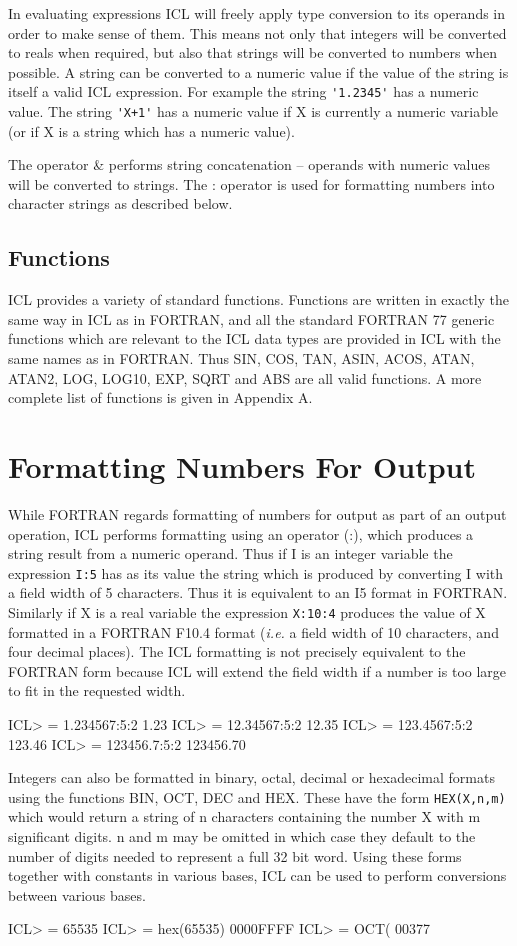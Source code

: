 \documentclass[twoside,11pt,nolof,chapters]{starlink}
\begin{document}
In evaluating expressions ICL will freely apply type conversion to its
operands in order to make sense of them. This means not only that integers
will be converted to reals when required, but also that strings will be
converted to numbers when possible. A string can be converted to a numeric value
if the value of the string is itself a valid ICL expression. For example the
string \verb+'1.2345'+ has a numeric value. The string \verb-'X+1'- has a numeric
value if X is currently a numeric variable (or if X is a string which has
a numeric value).

The operator \& performs string concatenation -- operands with numeric values
will be converted to strings. The : operator is used for
formatting numbers into character strings as described below.
\subsection{Functions}
ICL provides a variety of standard functions. Functions are written in
exactly the same way in ICL as in FORTRAN, and all the standard FORTRAN
77 generic functions which are relevant to the ICL data types are
provided in ICL with the
 same names as in FORTRAN. Thus SIN, COS, TAN,
ASIN, ACOS, ATAN, ATAN2, LOG, LOG10, EXP, SQRT and ABS are all valid
functions. A more complete list of functions is given in Appendix A.
\section{Formatting Numbers For Output}
While FORTRAN regards formatting of numbers for output as part of an
output operation, ICL performs formatting using an operator (:), which
produces a string result from a numeric operand. Thus if I is an integer
variable the expression \verb+I:5+ has as its value the string which is
produced by converting I with a field width of 5 characters. Thus it
is equivalent to an I5 format in FORTRAN. Similarly if X is a real
variable the expression \verb+X:10:4+ produces the value of X formatted
in a FORTRAN F10.4 format (\emph{i.e.} a field width of 10 characters, and
four decimal places). The ICL formatting is not precisely equivalent
to the FORTRAN form because ICL will extend the field width if a number
is too large to fit in the requested width.
\begin{terminalv}
    ICL> = 1.234567:5:2
     1.23
    ICL> = 12.34567:5:2
    12.35
    ICL> = 123.4567:5:2
    123.46
    ICL> = 123456.7:5:2
    123456.70
\end{terminalv}
Integers can also be formatted in binary, octal, decimal or hexadecimal formats
using the functions BIN, OCT, DEC and HEX. These have the form
\verb+HEX(X,n,m)+ which would return a string of n characters containing
the number X with m significant digits. n and m may be omitted in which case
they default to the number of digits needed to represent a full 32 bit word.
Using these forms together with constants in various bases, ICL can be used to
perform conversions between various bases.
\begin{terminalv}
    ICL> = %
          65535
    ICL> = hex(65535)
     0000FFFF
    ICL> = OCT(%
    00377
\end{terminalv}
\end{document}
